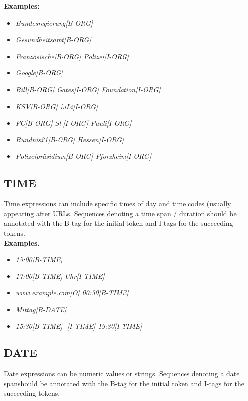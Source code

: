 \noindent\textbf{Examples:}
\begin{itemize}
	\item \textit{Bundesregierung[B-ORG]}
	\item \textit{Gesundheitsamt[B-ORG]}
	\item \textit{Französische[B-ORG] Polizei[I-ORG]}
	\item \textit{Google[B-ORG]}
	\item \textit{Bill[B-ORG]  Gates[I-ORG] Foundation[I-ORG]}
	\item \textit{KSV[B-ORG] LiLi[I-ORG]}
	\item \textit{FC[B-ORG] St.[I-ORG] Pauli[I-ORG]}
	\item \textit{Bündnis21[B-ORG] Hessen[I-ORG]}
	\item \textit{Polizeipräsidium[B-ORG] Pforzheim[I-ORG]}
\end{itemize}


\subsection*{TIME}
Time expressions can include specific times of day and time codes (usually appearing after URLs. Sequences denoting a time span / duration should be annotated with the B-tag for the initial token and I-tags for the succeeding tokens.\\ 

\noindent\textbf{Examples.}
\begin{itemize}
	\item \textit{15:00[B-TIME]}
	\item \textit{17:00[B-TIME] Uhr[I-TIME]}
	\item \textit{www.example.com[O] 00:30[B-TIME]}
	\item \textit{Mittag[B-DATE]}
	\item \textit{15:30[B-TIME] -[I-TIME] 19:30[I-TIME]}
\end{itemize}

\subsection*{DATE}
Date expressions can be numeric values or strings. Sequences denoting a date spanshould be annotated with the B-tag for the initial token and I-tags for the succeeding tokens.\\ 

